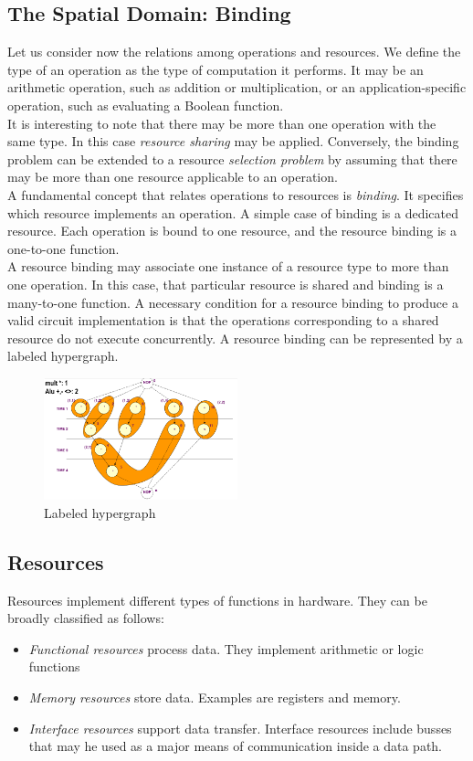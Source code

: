 \subsection{The  Spatial Domain: Binding}
Let us consider now the relations among operations and resources. We define the type  of an operation as the type of computation it performs. It may be an arithmetic operation, such as addition or multiplication, or an application-specific operation, such as evaluating a Boolean function.\\
It is interesting to note that there may be more than one operation with the same type. In this case \textit{resource sharing}  may be applied. Conversely, the binding problem can be extended to a resource \textit{selection problem} by assuming that there may be more than one resource applicable to an operation.\\
A  fundamental concept that relates operations to resources is  \textit{binding}. It specifies which resource implements an operation. A  simple case of binding is  a  dedicated resource. Each operation is bound to
one resource, and the resource binding is  a  one-to-one function.\\
A  resource binding may associate one instance of a resource type to more than one operation. In this case, that particular resource is  shared  and binding is a many-to-one function.  A  necessary condition for  a  resource binding to produce a valid circuit implementation is that the operations corresponding to a shared resource do not execute concurrently. A  resource binding can  be  represented by a  labeled hypergraph.
\begin{figure}[H]
	 \centering
	 \includegraphics[width=0.5\textwidth]{./Cap3/Images/Image21.png}
	 \caption[Optional caption]{Labeled hypergraph}
	 \label{fig:hypergraph}
\end{figure}

\subsection{Resources}
Resources implement different types of functions in hardware. They can be broadly classified as follows:
\begin{itemize}
\item \textit{Functional resources}  process data. They implement arithmetic or logic functions
\item \textit{Memory resources}  store data. Examples are registers and memory.
\item \textit{Interface resources}  support data transfer. Interface resources include busses that may he used as a major means  of  communication inside a data path.
\end{itemize}